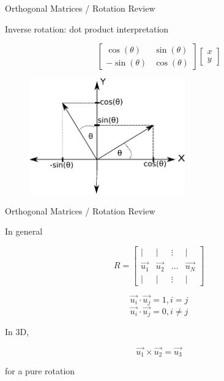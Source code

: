 \documentclass{beamer}
\begin{document}
\begin{frame}{Orthogonal Matrices / Rotation Review}

Inverse rotation: dot product interpretation

\[ \left[ \begin{array}{cc} \cos(\theta) & \sin(\theta) \\ -\sin(\theta) & \cos(\theta) \end{array}  \right] \left[ \begin{array}{c} x \\ y \end{array} \right]\]

\begin{figure}[t]
	\centering
    \includegraphics[width=0.6\textwidth]{ColumnVectorRotDual.pdf}
\end{figure}

\end{frame}



\begin{frame}{Orthogonal Matrices / Rotation Review}

In general

\[ R = \left[ \begin{array}{cccc} | & | & \vdots & | \\ \vec{u_1} & \vec{u_2} & \hdots & \vec{u_N} \\ | & | & \vdots & | \end{array} \right] \]

\[\vec{u_i} \cdot \vec{u_j} = 1, i = j \]
\[\vec{u_i} \cdot \vec{u_j} = 0, i \neq j \]

In 3D, 

\[ \vec{u_1} \times \vec{u_2} = \vec{u_3} \]

for a pure rotation

\end{frame}
\end{document}
